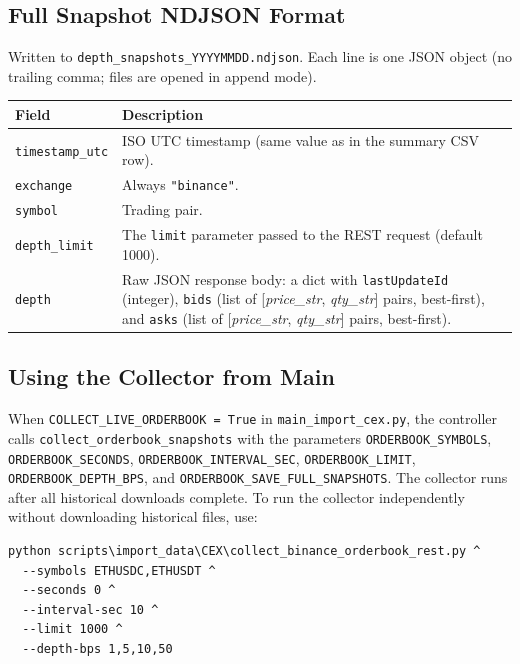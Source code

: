 \documentclass[11pt,a4paper]{article}
\begin{document}
\subsection{Full Snapshot NDJSON Format}

Written to \texttt{depth\_snapshots\_YYYYMMDD.ndjson}. Each line is
one JSON object (no trailing comma; files are opened in append mode).

\begin{xltabular}{\linewidth}{L{3.6cm}Y}
\toprule
\textbf{Field} & \textbf{Description} \\
\midrule
\texttt{timestamp\_utc} & ISO UTC timestamp (same value as in the
  summary CSV row). \\
\texttt{exchange} & Always \texttt{"binance"}. \\
\texttt{symbol} & Trading pair. \\
\texttt{depth\_limit} & The \texttt{limit} parameter passed to the
  REST request (default 1000). \\
\texttt{depth} & Raw JSON response body: a dict with
  \texttt{lastUpdateId} (integer), \texttt{bids} (list of
  [\textit{price\_str}, \textit{qty\_str}] pairs, best-first),
  and \texttt{asks} (list of [\textit{price\_str},
  \textit{qty\_str}] pairs, best-first). \\
\bottomrule
\end{xltabular}

\subsection{Using the Collector from Main}

When \texttt{COLLECT\_LIVE\_ORDERBOOK = True} in
\texttt{main\_import\_cex.py}, the controller calls
\texttt{collect\_orderbook\_snapshots} with the parameters
\texttt{ORDERBOOK\_SYMBOLS}, \texttt{ORDERBOOK\_SECONDS},
\texttt{ORDERBOOK\_INTERVAL\_SEC}, \texttt{ORDERBOOK\_LIMIT},
\texttt{ORDERBOOK\_DEPTH\_BPS}, and
\texttt{ORDERBOOK\_SAVE\_FULL\_SNAPSHOTS}. The collector runs
after all historical downloads complete. To run the collector
independently without downloading historical files, use:

\begin{lstlisting}
python scripts\import_data\CEX\collect_binance_orderbook_rest.py ^
  --symbols ETHUSDC,ETHUSDT ^
  --seconds 0 ^
  --interval-sec 10 ^
  --limit 1000 ^
  --depth-bps 1,5,10,50
\end{lstlisting}

\end{document}
